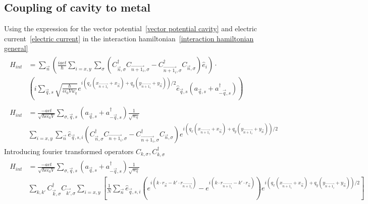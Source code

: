 \documentclass{article}
\begin{document}
\subsection{Coupling of cavity to metal}
Using the expression for the vector potential~\cref{vector potential cavity} and electric current~\cref{electric current} in the interaction hamiltonian~\cref{interaction hamiltonian general}
\begin{align*}
    \begin{split}
    H_{int} &= \sum_{\vec{n}} \left(\frac{iaet}{\hbar} \sum_{i=x,y}\sum_{\sigma} (C_{\vec{n},\sigma}^{\dagger} C_{\vec{n + 1_i},\sigma} - C_{\vec{n + 1_i},\sigma}^{\dagger} C_{\vec{n},\sigma})\hat{e}_i\right) \cdot \\     
            &\left(i \sum_{\vec{q},s} \sqrt{\frac{\hbar}{\epsilon \epsilon_0 V w_q}} e^{i\left(q_x \left(x_{\vec{n + 1_i}} + x_{\vec{n}} \right) + q_y \left(y_{\vec{n + 1_i}} + y_{\vec{n}} \right)\right)/2} \hat{e}_{\vec{q},s}\left(a_{\vec{q},s} + a_{-\vec{q}, s}^{\dagger}\right)\right)
    \end{split}\\
    \begin{split}
    H_{int} &= \frac{-aet}{\sqrt{\hbar \epsilon \epsilon_0 V} } \sum_{\sigma,\vec{q},s} \left(a_{\vec{q},s} + a_{-\vec{q}, s}^{\dagger}\right) \frac{1}{\sqrt{w_q}} \\ 
            &  \sum_{i=x,y} \sum_{\vec{n}} \hat{e}_{\vec{q},s,i} (C_{\vec{n},\sigma}^{\dagger} C_{\vec{n + 1_i},\sigma} - C_{\vec{n + 1_i},\sigma}^{\dagger} C_{\vec{n},\sigma}) e^{i\left(q_x \left(x_{\vec{n + 1_i}} + x_{\vec{n}} \right) + q_y \left(y_{\vec{n + 1_i}} + y_{\vec{n}} \right)\right)/2}
    \end{split}
     \label{interaction hamiltonian step 1}\textbf{}
\end{align*}
Introducing fourier transformed operators $C_{k,\sigma} , C_{k,\sigma}^{\dagger}$
\begin{align*}
    \begin{split}
    H_{int} &= \frac{-aet}{\sqrt{\hbar \epsilon \epsilon_0 V} } \sum_{\sigma,\vec{q},s} \left(a_{\vec{q},s} + a_{-\vec{q}, s}^{\dagger}\right) \frac{1}{\sqrt{w_q}} \\ 
            & \sum_{k,k'}   C_{\vec{k},\sigma}^{\dagger} C_{\vec{k'},\sigma} \sum_{i=x,y} \left[\frac{1}{N}\sum_{\vec{n}} \hat{e}_{\vec{q},s,i} ( e^{i\left(k \cdot r_{\vec{n}} - k' \cdot r_{\vec{n+1_i}} \right)} - e^{i\left(k \cdot r_{\vec{n+1_i}} - k' \cdot r_{\vec{n}} \right)}) e^{i\left(q_x \left(x_{\vec{n + 1_i}} + x_{\vec{n}} \right) + q_y \left(y_{\vec{n + 1_i}} + y_{\vec{n}} \right)\right)/2}\right]
    \end{split}
    \label{interaction hamiltonian step 2}
\end{align*}
\end{document}
